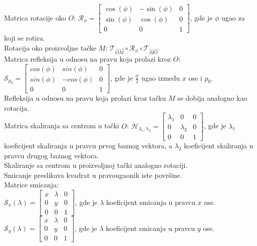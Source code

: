 \documentclass[12pt]{article}
\newcommand{\vek}[1]{\overrightarrow{#1}}
\begin{document}
    Matrica rotacije oko $O$:
$\mathcal{R}_\phi=\begin{bmatrix}
    \cos(\phi) & -\sin(\phi) & 0 \\
    \sin(\phi) & \cos(\phi)  & 0 \\
    0          & 0           & 1
\end{bmatrix}$, gde je $\phi$ ugao za koji se rotira.\\
    Rotacija oko proizvoljne tačke $M$:
$\mathcal{T}_{\vek{OM}}\circ\mathcal{R}_\phi\circ\mathcal{T}_{\vek{MO}}$.\\
    Matrica refleksija u odnosu na pravu koja prolazi kroz $O$:
$\mathcal{S}_{p_0}=\begin{bmatrix}
    cos(\phi) & sin(\phi)  & 0 \\
    sin(\phi) & -cos(\phi) & 0 \\
    0         & 0          & 1
\end{bmatrix}$, gde je $\frac{\phi}{2}$ ugao između $x$ ose i $p_0$.\\
    Refleksija u odnosu na pravu koja prolazi kroz tačku $M$ se dobija analogno kao rotacija.\\
    Matrica skaliranja sa centrom u tački $O$:
$\mathcal{H}_{\lambda_1,\lambda_2}=\begin{bmatrix}
    \lambda_1 & 0         & 0 \\
    0         & \lambda_2 & 0 \\
    0         & 0         & 1
\end{bmatrix}$, gde je $\lambda_1$ koeficijent skaliranja u pravcu
    prvog baznog vektora, a $\lambda_2$ koeficijent skaliranja u pravcu
    drugog baznog vektora.\\
    Skaliranje sa centrom u proizvoljnoj tački analogno rotaciji.\\
    Smicanje preslikava kvadrat u pravougaonik iste površine.\\
    Matrice smicanja:\\
$\mathcal{S}_x(\lambda)=\begin{bmatrix}
    x & \lambda & 0 \\
    0 & y       & 0 \\
    0 & 0       & 1
\end{bmatrix}$, gde je $\lambda$ koeficijent smicanja u pravcu $x$ ose.\\
$\mathcal{S}_y(\lambda)=\begin{bmatrix}
    x & \lambda & 0 \\
    0 & y       & 0 \\
    0 & 0       & 1
\end{bmatrix}$, gde je $\lambda$ koeficijent smicanja u pravcu $y$ ose.
\end{document}
